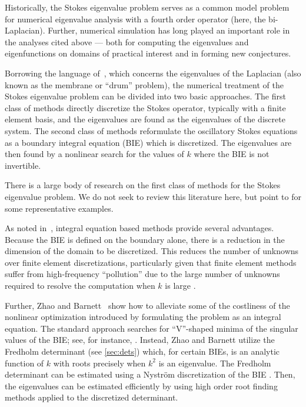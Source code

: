 Historically, the Stokes eigenvalue problem serves as a
common model problem for numerical eigenvalue analysis
with a fourth order operator (here, the bi-Laplacian).
%
Further, numerical simulation has long played an
important role in the analyses cited above --- both for
computing the eigenvalues and eigenfunctions
on domains of practical interest and in forming
new conjectures.

Borrowing the language of~\cite{zhao2015robust},
which concerns the eigenvalues of the Laplacian
(also known as the membrane or ``drum'' problem),
the numerical treatment of the Stokes eigenvalue
problem can be divided into two basic approaches.
%
The first class of methods
directly discretize the
Stokes operator, typically with a
finite element basis, and the eigenvalues are found
as the eigenvalues of the discrete system.
%
The second class of methods reformulate the 
oscillatory Stokes equations as a boundary integral
equation (BIE) which is discretized.
The eigenvalues are then found
by a nonlinear search for the values of
$k$ where the BIE is not invertible.
%

There is a large body of research on the first class of methods
for the Stokes eigenvalue problem.
%
We do not seek to review this literature here,
but point to \cite{johnson1974beam,
  rannacher1979nonconforming,
  mercier1981eigenvalue,bjorstad1999high,
  jia2009approximation,chen2006approximation,
  lovadina2009posteriori,huang2011numerical,
  carstensen2014guaranteed}
for some representative examples.

As noted in~\cite{zhao2015robust}, integral
equation based methods provide several advantages.
%
Because the BIE is defined on the
boundary alone, there is a reduction in the
dimension of the domain to be discretized.
%
This reduces the number of unknowns over finite
element discretizations, particularly given
that finite element methods suffer from
high-frequency ``pollution'' due to the 
large number of unknowns required to resolve
the computation when $k$ is large
\cite{babuska1997pollution}.

Further, Zhao and Barnett~\cite{zhao2015robust}
show how to alleviate some of the costliness of the
nonlinear optimization introduced by formulating the 
problem as an integral equation.
%
The standard approach searches for ``V''-shaped minima
of the singular values of the BIE; see, for
instance, \cite{trefethen2006computed}.
%
Instead, Zhao and Barnett utilize the Fredholm
determinant (see \cref{sec:dets}) which, for certain
BIEs, is an analytic function of $k$ with roots
precisely when $k^2$ is an eigenvalue.
%
The Fredholm determinant can be estimated using
a Nystr\"{o}m discretization of the BIE
\cite{bornemann2010numerical,zhao2015robust}.
%
Then, the eigenvalues can be estimated efficiently
by using high order root finding methods applied
to the discretized determinant.

